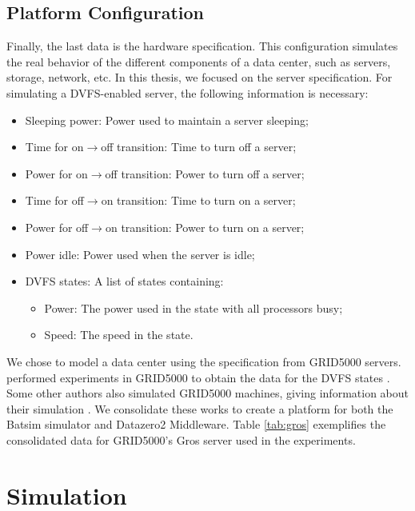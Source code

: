 \subsection{Platform Configuration}
\label{sec:platform_configuration}

Finally, the last data is the hardware specification. This configuration simulates the real behavior of the different components of a data center, such as servers, storage, network, etc. In this thesis, we focused on the server specification. For simulating a DVFS-enabled server, the following information is necessary:
\begin{itemize}
    \item Sleeping power: Power used to maintain a server sleeping;
    \item Time for on\(\rightarrow\)off transition: Time to turn off a server;
    \item Power for on\(\rightarrow\)off transition: Power to turn off a server;
    \item Time for off\(\rightarrow\)on transition: Time to turn on a server;
    \item Power for off\(\rightarrow\)on transition: Power to turn on a server;
    \item Power idle: Power used when the server is idle;
    \item DVFS states: A list of states containing:
    \begin{itemize}
        \item Power: The power used in the state with all processors busy;
        \item Speed: The speed in the state.
    \end{itemize}
\end{itemize}

We chose to model a data center using the specification from GRID5000 servers. \citeauthor{dacosta:hal-03453537v1} performed experiments in GRID5000 to obtain the data for the DVFS states \cite{dacosta:hal-03453537v1, dacostakeynote}. Some other authors also simulated GRID5000 machines, giving information about their simulation \cite{rais2018quantifying, caux2018optimization, caux2019phase, villebonnet2016energy}. We consolidate these works to create a platform for both the Batsim simulator and Datazero2 Middleware. Table \ref{tab:gros} exemplifies the consolidated data for GRID5000's Gros server used in the experiments.



\section{Simulation}
\label{sec:simulation}

